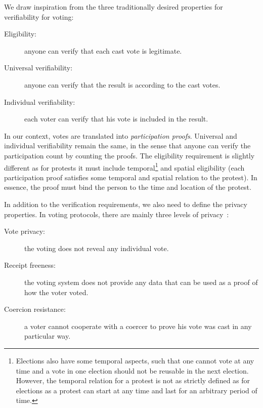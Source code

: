 We draw inspiration from the three traditionally desired properties for verifiability for voting:
\begin{description}
  \item[Eligibility:] anyone can verify that each cast vote is legitimate.
  \item[Universal verifiability:] anyone can verify that the result is according to the cast votes.
  \item[Individual verifiability:] each voter can verify that his vote is included in the result.
\end{description}
In our context, votes are translated into \emph{participation proofs}.
Universal and individual verifiability remain the same, in the sense that anyone can verify the participation count by counting the proofs.
The eligibility requirement is slightly different as for protests it must 
include temporal\footnote{%
  Elections also have some temporal aspects, such that one cannot vote at any 
  time and a vote in one election should not be reusable in the next election.
  However, the temporal relation for a protest is not as strictly defined as for 
  elections as a protest can start at any time and last for an arbitrary period 
  of time.%
} and spatial eligibility (\ie each participation proof satisfies some temporal 
and spatial relation to the protest).
In essence, the proof must bind the person to the time and location of the protest.

In addition to the verification requirements, we also need to define the 
privacy properties.
In voting protocols, there are mainly three levels of privacy~\cite{VerifyingPrivacyPropertiesOfVotingProtocols}:
\begin{description}
  \item[Vote privacy:] the voting does not reveal any individual vote.
  \item[Receipt freeness:] the voting system does not provide any data that can be used as a proof of how the voter voted.
  \item[Coercion resistance:] a voter cannot cooperate with a coercer to prove his vote was cast in any particular way.
\end{description}

